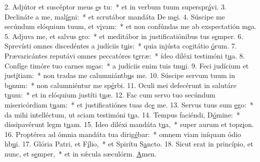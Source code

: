 2. Adjútor et suscéptor meus \uline{e}s tu:~* et in verbum tuum superspr\uline{á}vi.
3. Declináte a me, mal\uline{í}gni:~* et scrutábor mandáta De m\uline{e}i.
4. Súscipe me secúndum elóquium tuum, et v\uline{i}vam:~* et non confúndas me ab exspectatión m\uline{e}a.
5. Adjuva me, et salvus \uline{e}ro:~* et meditábor in justificatiónibus tus s\uline{e}mper.
6. Sprevísti omnes discedéntes a judíciis t\uline{u}is:~* quia injústa cogitátio \uline{ó}rum.
7. Prævaricántes reputávi omnes peccatóres t\uline{e}rræ:~* ídeo diléxi testimóni t\uline{u}a.
8. Confíge timóre tuo carnes m\uline{e}as:~* a judíciis enim tuis tm\uline{u}i.
9. Feci judícium et just\uline{í}tiam:~* non tradas me calumniántb\uline{u}s me.
10. Súscipe servum tuum in b\uline{o}num:~* non calumniéntur me sp\uline{é}rbi.
11. Oculi mei defecérunt in salutáre t\uline{u}um:~* et in elóquium justíti t\uline{u}æ.
12. Fac cum servo tuo secúndum misericórdiam t\uline{u}am:~* et justificatiónes tuas dc\uline{e} me.
13. Servus tuus sum \uline{e}go:~* da mihi intelléctum, ut sciam testimóni t\uline{u}a.
14. Tempus faciéndi, D\uline{ó}mine:~* díssipavérunt legm t\uline{u}am.
15. Ideo diléxi mandáta t\uline{u}a,~* super aurum et topz\uline{i}on.
16. Proptérea ad ómnia mandáta tua dirig\uline{é}bar:~* omnem viam iníquam ódio hb\uline{u}i.
17. Glória Patri, et F\uline{í}lio,~* et Spirítu S\uline{a}ncto.
18. Sicut erat in princípio, et nunc, et s\uline{e}mper,~* et in sǽcula sæculórm. \uline{A}men.
